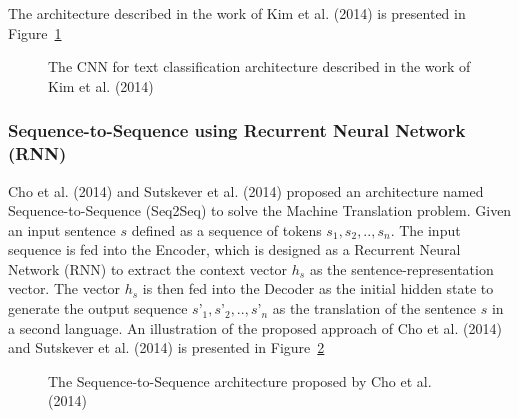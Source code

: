 \documentclass[pdflatex,sn-mathphys]{sn-jnl}%
\theoremstyle{thmstyleone}%
\theoremstyle{thmstyletwo}%
\theoremstyle{thmstylethree}%
\begin{document}
The architecture described in the work of Kim et al. (2014) is presented in Figure~\ref{fig:kim2014}

\begin{figure}[htp]
\centering
{}
\caption{The CNN for text classification architecture described in the work of Kim et al. (2014)\cite{Kim2014}}
\label{fig:kim2014}
\end{figure}

\subsubsection{Sequence-to-Sequence using Recurrent Neural Network (RNN)}
Cho et al. (2014)\cite{Cho2014} and Sutskever et al. (2014)\cite{Sutskever2014} proposed an architecture named Sequence-to-Sequence (Seq2Seq) to solve the Machine Translation problem. Given an input sentence $s$ defined as a sequence of tokens $s_1, s_2, .., s_n$. The input sequence is fed into the Encoder, which is designed as a Recurrent Neural Network (RNN) to extract the context vector $h_s$ as the sentence-representation vector. The vector $h_s$ is then fed into the Decoder as the initial hidden state to generate the output sequence $s’_1, s’_2, .., s’_n$ as the translation of the sentence $s$ in a second language. An illustration of the proposed approach of Cho et al. (2014) and Sutskever et al. (2014) is presented in Figure~\ref{fig:seq2seq}

\begin{figure}[htp]
\centering
{}
\caption{The Sequence-to-Sequence architecture proposed by Cho et al. (2014)\cite{Cho2014}}
\label{fig:seq2seq}
\end{figure}
\end{document}
